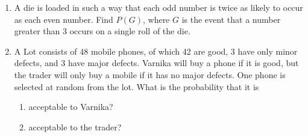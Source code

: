 \begin{enumerate}[label=\thesection.\arabic*,ref=\thesection.\theenumi]
	\item  A die is loaded in such a way that each odd number is twice as likely to occur as
each even number. Find $P(G)$, where $G$ is the event that a number greater than
3 occurs on a single roll of the die.
\\
\solution
		
	\item A Lot consists of 48 mobile phones, of which 42 are good, 3 have only minor defects, and 3 have major defects. Varnika will buy a phone if it is good, but the trader will only buy a mobile if it has no major defects. One phone is selected at random from the lot. What is the probability that it is
\begin{enumerate}
	\item acceptable to Varnika?
            \item acceptable to the trader?
\end{enumerate}
\\
\solution 
		
\end{enumerate}
